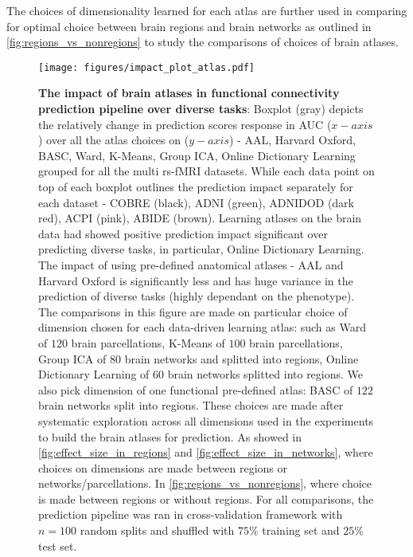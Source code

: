 \documentclass[5p]{elsarticle}
\begin{document}
The choices of dimensionality learned for each atlas are further
used in comparing
for optimal choice between brain regions and brain networks as outlined in
\autoref{fig:regions_vs_nonregions} to study the comparisons of choices of
brain atlases.

\begin{figure}
    \centerline{%
    \texttt{[image: figures/impact\_plot\_atlas.pdf]}%
    }%
    \caption[choice of atlas]{\textbf{The impact of brain atlases in
            functional connectivity prediction pipeline over diverse tasks}:
            Boxplot (gray) depicts the relatively change in prediction
            scores response in AUC ($x-axis$) over all the atlas choices on
            ($y-axis$) - AAL, Harvard Oxford, BASC, Ward, K-Means, Group ICA,
            Online Dictionary Learning grouped for all the multi rs-fMRI
            datasets. While each data point on top of each boxplot outlines
            the prediction impact separately for each dataset - COBRE (black),
            ADNI (green), ADNIDOD (dark red), ACPI (pink), ABIDE (brown).
            Learning atlases on the brain data had showed positive prediction
            impact significant over predicting diverse tasks, in particular,
            Online Dictionary Learning. The impact of using pre-defined
            anatomical atlases - AAL and Harvard Oxford is significantly less
            and has huge variance in the prediction of diverse tasks (highly
            dependant on the phenotype). The comparisons in this figure
            are made on particular choice of dimension chosen for each
            data-driven learning atlas: such as Ward of $120$ brain
            parcellations, K-Means of $100$ brain parcellations, Group ICA of
            $80$ brain networks and splitted into regions, Online Dictionary
            Learning of $60$ brain networks splitted into regions. We also
            pick dimension of one functional pre-defined atlas: BASC of $122$
            brain networks split into regions. These choices are made after
            systematic exploration across all dimensions used
            in the experiments to build the brain atlases for prediction. As
            showed in \autoref{fig:effect_size_in_regions} and
            \autoref{fig:effect_size_in_networks}, where choices on dimensions
            are made between regions or networks/parcellations. In
            \autoref{fig:regions_vs_nonregions}, where choice is made between
            regions or without regions. For all comparisons, the prediction
            pipeline was ran in cross-validation framework with $n=100$
            random splits and shuffled with $75\%$ training set and $25\%$
            test set.
    \label{fig:impact_atlas}}
\end{figure}
\end{document}
